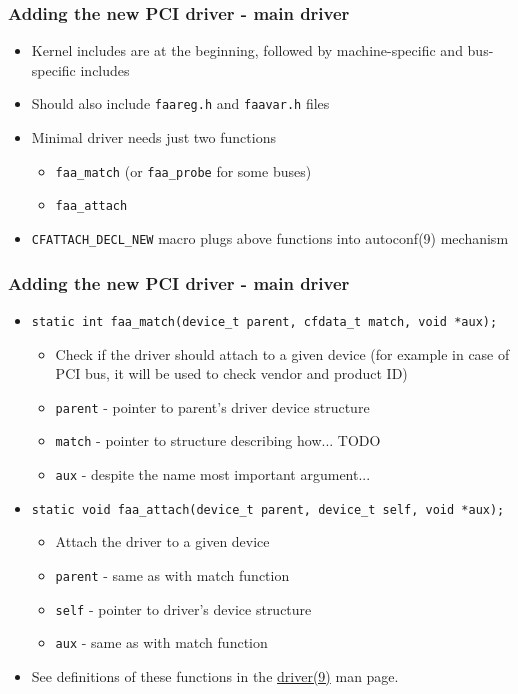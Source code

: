 \documentclass[dvipsnames,table]{beamer}
\begin{document}
\begin{frame}
\frametitle{Adding the new PCI driver - main driver}
\begin{itemize}
	\item Kernel includes are at the beginning, followed by machine-specific and bus-specific includes
	\item Should also include {\tt faareg.h} and {\tt faavar.h} files
	\item Minimal driver needs just two functions
	\begin{itemize}
		\item {\tt faa\_match} (or {\tt faa\_probe} for some buses)
		\item {\tt faa\_attach}
	\end{itemize}
	\item {\tt CFATTACH\_DECL\_NEW} macro plugs above functions into autoconf(9) mechanism
\end{itemize}
\end{frame}

\begin{frame}
\frametitle{Adding the new PCI driver - main driver}
\begin{itemize}
	\item {\tt static int faa\_match(device\_t parent, cfdata\_t match, void *aux);}	
	\begin{itemize}
		\item Check if the driver should attach to a given device (for example in case of PCI bus, it will be used to check vendor and product ID)
		\item {\tt parent} - pointer to parent's driver device structure
		\item {\tt match} - pointer to structure describing how... TODO
		\item {\tt aux} - despite the name most important argument...
	\end{itemize}
	\item {\tt static void faa\_attach(device\_t parent, device\_t self, void *aux);}
	\begin{itemize}
		\item Attach the driver to a given device
		\item {\tt parent} - same as with match function
		\item {\tt self} - pointer to driver's device structure
		\item {\tt aux} - same as with match function
	\end{itemize}

	\item See definitions of these functions in the \href{http://netbsd.gw.com/cgi-bin/man-cgi?driver+9+NetBSD-current}{driver(9)} man page.
\end{itemize}
\end{frame}
\end{document}
